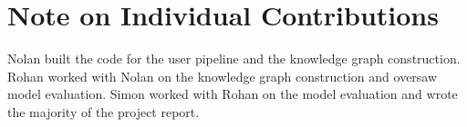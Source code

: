 \documentclass[11pt]{article}
\begin{document}
\section*{Note on Individual Contributions}
Nolan built the code for the user pipeline and the knowledge graph construction. Rohan worked with Nolan on the knowledge graph construction and oversaw model evaluation. Simon worked with Rohan on the model evaluation and wrote the majority of the project report.

%

\end{document}
